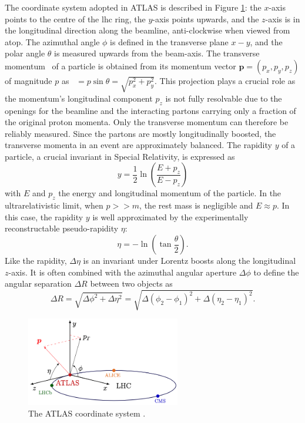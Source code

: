 The coordinate system adopted in ATLAS is described in Figure \ref{fig-AtlasCoord}: the $x$-axis points to the centre of the \gls{lhc} ring, the $y$-axis points upwards, and the $z$-axis is in the longitudinal direction along the beamline, anti-clockwise when viewed from atop. The azimuthal angle $\phi$ is defined in the transverse plane $x-y$, and the polar angle $\theta$ is measured upwards from the beam-axis. The transverse momentum \pt\ of a particle is obtained from its momentum vector $\boldsymbol{p} = (p_x, p_y, p_z)$ of magnitude $p$ as \pt\ $=p \sin\theta = \sqrt{p_x^2 + p_y^2}$. This projection plays a crucial role as the momentum's longitudinal component $p_z$ is not fully resolvable due to the openings for the beamline and the interacting partons carrying only a fraction of the original proton momenta. Only the transverse momentum can therefore be reliably measured. Since the partons are mostly longitudinally boosted, the transverse momenta in an event are approximately balanced. The rapidity $y$ of a particle, a crucial invariant in Special Relativity, is expressed as 
\begin{equation}
  y = \frac{1}{2} \ln \left(\frac{E + p_z}{E - p_z}\right)
\end{equation}
with $E$ and $p_z$ the energy and longitudinal momentum of the particle. In the ultrarelativistic limit, when $p >> m$, the rest mass is negligible and $E \approx p$. In this case, the rapidity $y$ is well approximated by the experimentally reconstructable pseudo-rapidity $\eta$:
\begin{equation}
  \eta = -\ln \left(\tan \frac{\theta}{2}\right).
\end{equation}
Like the rapidity, $\Delta \eta$ is an invariant under Lorentz boosts along the longitudinal $z$-axis. It is often combined with the azimuthal angular aperture $\Delta \phi$ to define the angular separation $\Delta R$ between two objects as 
\begin{equation}\label{eq-def-deltaR}
  \Delta R = \sqrt{\Delta \phi^2 + \Delta \eta^2} =  \sqrt{\Delta (\phi_2 - \phi_1)^2 + \Delta (\eta_2 - \eta_1)^2}.
\end{equation}

\begin{figure}[!h]
  \centering
  \includegraphics[width=0.6\textwidth]{Images/ATLAS/atlasCoor.png}
  \caption{The ATLAS coordinate system \cite{Strong:2020mge}.}
  \label{fig-AtlasCoord}
\end{figure}

